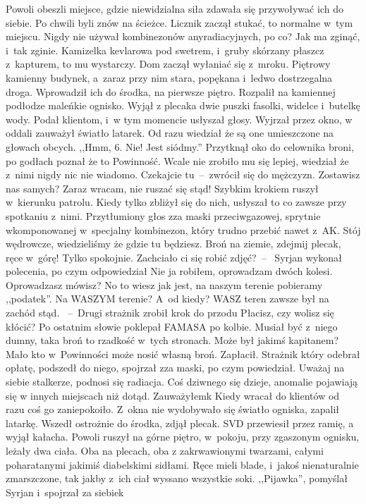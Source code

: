 \documentclass[../MAIN.tex]{subfiles}
\begin{document}
Powoli obeszli miejsce,
gdzie niewidzialna siła zdawała się przywoływać ich do siebie.
Po chwili byli znów na ścieżce. Licznik zaczął stukać, to
normalne w~tym miejscu. Nigdy nie używał kombinezonów
anyradiacyjnych, po co? Jak ma zginąć, i~tak zginie. Kamizelka
kevlarowa pod swetrem, i~gruby skórzany płaszcz z~kapturem, to
mu wystarczy. Dom zaczął wyłaniać się z~mroku. Piętrowy
kamienny budynek, a~zaraz przy nim stara, popękana i~ledwo
dostrzegalna droga. Wprowadził ich do środka, na pierwsze
piętro. Rozpalił na kamiennej podłodze maleńkie ognisko. Wyjął
z plecaka dwie puszki fasolki, widelce i~butelkę wody. Podał
klientom, i~w tym momencie usłyszał głosy. Wyjrzał przez okno,
w oddali zauważył światło latarek. Od razu wiedział że są one
umieszczone na głowach obcych. ,,Hmm, 6. Nie! Jest siódmy.''
Przytknął oko do celownika broni, po godłach poznał że to
Powinność. Wcale nie zrobiło mu się lepiej, wiedział że z~nimi
nigdy nic nie wiadomo.
\sd
\xx Czekajcie tu~--~zwrócił się do
mężczyzn.
\xx Zostawisz nas samych?
\xx Zaraz wracam, nie ruszać się
stąd!
\qd
Szybkim krokiem ruszył w~kierunku patrolu. Kiedy tylko zbliżył
się do nich, usłyszał to co zawsze przy spotkaniu z~nimi.
Przytłumiony głos zza maski przeciwgazowej, sprytnie
wkomponowanej w~specjalny kombinezon, który trudno przebić
nawet z~AK.
\sd
\xx Stój wędrowcze, wiedzieliśmy że gdzie tu będziesz.
Broń na ziemie, zdejmij plecak, ręce w~górę! Tylko spokojnie.
Zachciało ci się robić zdjęć?~--~
Syrjan wykonał polecenia, po czym
odpowiedział
\xx Nie ja robiłem, oprowadzam dwóch kolesi.
\xx Oprowadzasz mówisz? No to wiesz jak jest, na naszym terenie
pobieramy ,,podatek''.
\xx Na WASZYM terenie? A~od kiedy? WASZ
teren
zawsze był na zachód stąd. ~--~Drugi strażnik zrobił krok do
przodu
\xx Płacisz, czy wolisz się kłócić?
\qd
Po ostatnim słowie
poklepał FAMASA po kolbie. Musiał być z~niego dumny, taka broń
to rzadkość w~tych stronach. Może był jakimś kapitanem? Mało
kto w~Powinności może nosić własną broń. Zapłacił. Strażnik
który odebrał opłatę, podszedł do niego, spojrzał zza maski, po
czym powiedział.
\sd
\xx Uważaj na siebie stalkerze, podnosi się
radiacja. Coś dziwnego się dzieje, anomalie pojawiają się w
innych miejscach niż dotąd.
\xx Zauważyłem\3k
\qd
Kiedy wracał do klientów od razu coś go zaniepokoiło. Z~okna
nie wydobywało się światło ogniska, zapalił latarkę. Wszedł
ostrożnie do środka, zdjął plecak. SVD przewiesił przez ramię,
a wyjął kałacha. Powoli ruszył na górne piętro, w~pokoju, przy
zgaszonym ognisku, leżały dwa ciała. Oba na plecach, oba z
zakrwawionymi twarzami, całymi poharatanymi jakimiś diabelskimi
sidłami. Ręce mieli blade, i~jakoś nienaturalnie zmarszczone,
tak jakby z~ich ciał wyssano wszystkie soki. ,,Pijawka'',
pomyślał Syrjan i~spojrzał za siebie\3k
\end{document}
